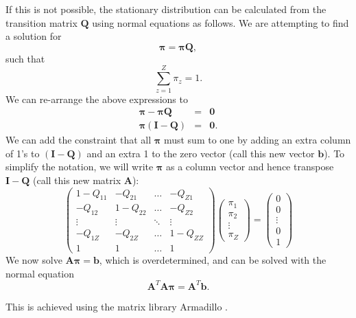 \documentclass[a4paper,11pt]{article}
\def\A{\boldsymbol{A}}
\def\I{\boldsymbol{I}}
\def\Q{\boldsymbol{Q}}
\def\bpi{\boldsymbol{\pi}}
\begin{document}
If this is not possible, the stationary distribution can be calculated from the transition matrix $\Q$ using normal equations as follows. We are attempting to find a solution for
\begin{equation*}
 \bpi = \bpi \Q,
\end{equation*}
such that
\begin{equation*}
 \sum_{z=1}^Z \pi_z = 1.
\end{equation*}
We can re-arrange the above expressions to
\begin{eqnarray*}
 \bpi - \bpi \Q &=& \boldsymbol 0 \\
 \bpi(\I - \Q) &=& \boldsymbol 0.
\end{eqnarray*}
We can add the constraint that all $\bpi$ must sum to one by adding an extra column of 1's to $(\I - \Q)$ and an extra 1 to the zero vector (call this new vector $\boldsymbol b$). To simplify the notation, we will write $\bpi$ as a column vector and hence transpose $\I - \Q$ (call this new matrix $\A$):
\begin{equation*}
 \begin{pmatrix}
  1-Q_{11} & -Q_{21} & \dots & -Q_{Z1} \\
  -Q_{12} & 1-Q_{22} & \dots & -Q_{Z2} \\
  \vdots & \vdots & \ddots & \vdots \\
  -Q_{1Z} & -Q_{2Z} & \dots & 1-Q_{ZZ} \\
  1 & 1 & \ldots & 1
\end{pmatrix}
\begin{pmatrix}
  \pi_1\\
  \pi_2\\
  \vdots\\
  \pi_Z
 \end{pmatrix}
 =
 \begin{pmatrix}
 0\\
 0\\
 \vdots\\
 0\\
 1
 \end{pmatrix}
\end{equation*}
We now solve $\A \bpi = \boldsymbol b$, which is overdetermined, and can be solved with the normal equation
\begin{equation*}
 \A^T \A \bpi=\A^T \boldsymbol b.
\end{equation*}

This is achieved using the matrix library Armadillo \citep{sanderson2016, sanderson2019}.
\end{document}
